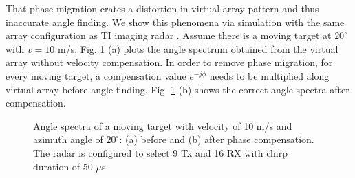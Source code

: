 \documentclass[conference]{IEEEtran}
\begin{document}
That phase migration crates a distortion in virtual array pattern and thus inaccurate angle finding. We show this phenomena via simulation with the same array configuration as TI imaging radar \cite{TI_Cascade}. Assume there is a moving target at $20^\circ$  with $v=10$ m/s. Fig. \ref{fig_angle_spectra_moving_target} (a) plots the angle spectrum obtained from the virtual array without velocity compensation. In order to remove phase migration, for every moving target, a compensation value $e^{-j\phi}$ needs to be multiplied along virtual array before angle finding. 
Fig. \ref{fig_angle_spectra_moving_target} (b) shows the correct angle spectra after compensation. 
\vspace{-3mm}
\begin{figure}[h]
\centering
{}
\vspace{-3mm}
\caption{\label{fig_angle_spectra_moving_target} Angle spectra of a moving target with velocity of 10 m/s and azimuth angle of $20^\circ$: (a) before and (b) after phase compensation. The radar is configured to select 9 Tx and 16 RX with chirp duration of $50$ $\mu$s.}
\end{figure}


\vspace{-3mm}
\end{document}

